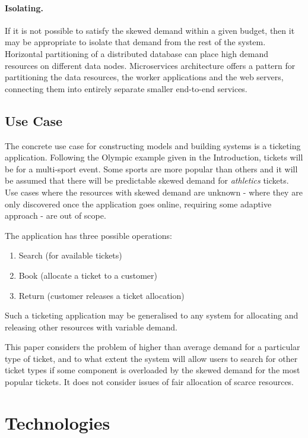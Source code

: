 \documentclass[runningheads]{llncs}
\begin{document}
\paragraph{Isolating.} If it is not possible to satisfy the skewed demand within a given budget, then it may be appropriate to isolate that demand from the rest of the system.  Horizontal partitioning of a distributed database can place high demand resources on different data nodes.  Microservices architecture offers a pattern for partitioning the data resources, the worker applications and the web servers, connecting them into entirely separate smaller end-to-end services.

\subsection{Use Case}

The concrete use case for constructing models and building systems is a ticketing application.  Following the Olympic example given in the Introduction, tickets will be for a multi-sport event.  Some sports are more popular than others and it will be assumed that there will be predictable skewed demand for {\itshape athletics} tickets.  Use cases where the resources with skewed demand are unknown - where they are only discovered once the application goes online, requiring some adaptive approach - are out of scope.

The application has three possible operations:
\begin{enumerate}
\item Search (for available tickets)
\item Book (allocate a ticket to a customer)
\item Return (customer releases a ticket allocation)
\end{enumerate}

Such a ticketing application may be generalised to any system for allocating and releasing other resources with variable demand.

This paper considers the problem of higher than average demand for a particular type of ticket, and to what extent the system will allow users to search for other ticket types if some component is overloaded by the skewed demand for the most popular tickets.  It does not consider issues of fair allocation of scarce resources.

%
%

\section{Technologies}\label{sec:technologies}
\end{document}
